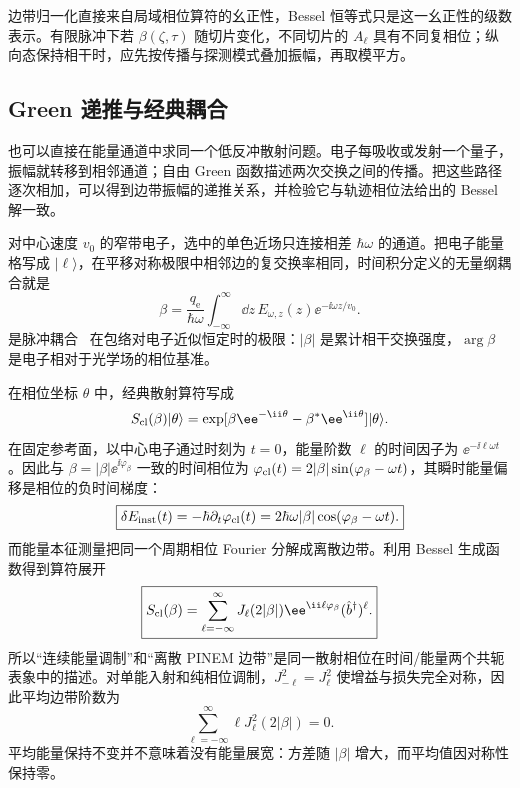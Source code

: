 边带归一化直接来自局域相位算符的幺正性，Bessel 恒等式只是这一幺正性的级数表示。有限脉冲下若 $\beta(\zeta,\tau)$ 随切片变化，不同切片的 $A_\ell$ 具有不同复相位；纵向态保持相干时，应先按传播与探测模式叠加振幅，再取模平方。



\subsection{Green 递推与经典耦合}

也可以直接在能量通道中求同一个低反冲散射问题。电子每吸收或发射一个量子，振幅就转移到相邻通道；自由 Green 函数描述两次交换之间的传播。把这些路径逐次相加，可以得到边带振幅的递推关系，并检验它与轨迹相位法给出的 Bessel 解一致。

对中心速度 $v_0$ 的窄带电子，选中的单色近场只连接相差 $\hbar\omega$ 的通道。把电子能量格写成 $|\ell\rangle$，在平移对称极限中相邻边的复交换率相同，时间积分定义的无量纲耦合就是
\begin{equation}
\boxed{
\beta
=\frac{q_{\mathrm e}}{\hbar\omega}
\int_{-\infty}^{\infty}\dd z\,
E_{\omega,z}(z)\ee^{-\ii\omega z/v_0}.}
\label{eq:beta_master}
\end{equation}
 是脉冲耦合~ 在包络对电子近似恒定时的极限：$|\beta|$ 是累计相干交换强度，$\arg\beta$ 是电子相对于光学场的相位基准。

在相位坐标 $\theta$ 中，经典散射算符写成
\begin{equation*}
S_{\rm cl}(\beta)|\theta\rangle
=\exp[\beta \ee^{-\ii\theta}-\beta^*\ee^{\ii\theta}]|\theta\rangle.
\end{equation*}
在固定参考面，以中心电子通过时刻为 $t=0$，能量阶数 $\ell$ 的时间因子为 $\ee^{-\ii\ell\omega t}$。因此与 $\beta=|\beta|\ee^{\ii\varphi_\beta}$ 一致的时间相位为 $\varphi_{\rm cl}(t)=2|\beta|\sin(\varphi_\beta-\omega t)$，其瞬时能量偏移是相位的负时间梯度：
\begin{equation}
\boxed{
\delta E_{\rm inst}(t)
=-\hbar\partial_t\varphi_{\rm cl}(t)
=2\hbar\omega|\beta|\cos(\varphi_\beta-\omega t).}
\label{eq:classical_energy_mod_from_beta}
\end{equation}
而能量本征测量把同一个周期相位 Fourier 分解成离散边带。利用 Bessel 生成函数得到算符展开
\begin{equation}
\boxed{
S_{\rm cl}(\beta)
=\sum_{\ell=-\infty}^{\infty}
J_\ell(2|\beta|)\ee^{\ii\ell\varphi_\beta}(\hat b^\dagger)^\ell.}
\label{eq:pinem_fourier_expansion}
\end{equation}
所以“连续能量调制”和“离散 PINEM 边带”是同一散射相位在时间/能量两个共轭表象中的描述。对单能入射和纯相位调制，$J_{-\ell}^2=J_{\ell}^2$ 使增益与损失完全对称，因此平均边带阶数为
\begin{equation}
\boxed{\sum_{\ell=-\infty}^{\infty}\ell J_\ell^2(2|\beta|)=0.}
\label{eq:pinem_zero_mean}
\end{equation}
平均能量保持不变并不意味着没有能量展宽：方差随 $|\beta|$ 增大，而平均值因对称性保持零。

